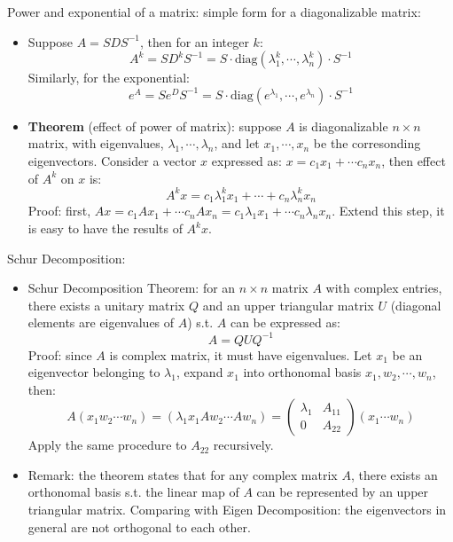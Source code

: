 \documentclass{report}
\begin{document}
Power and exponential of a matrix: simple form for a diagonalizable matrix:
\begin{itemize}
\item Suppose $A = SDS^{-1}$, then for an integer $k$: 
\begin{equation}
A^k	= S D^k S^{-1} = S \cdot \text{diag}(\lambda_1^k, \cdots, \lambda_n^k) \cdot S^{-1}
\end{equation}
Similarly, for the exponential: 
\begin{equation}
e^A	= S e^D S^{-1} = S \cdot \text{diag}(e^{\lambda_1}, \cdots, e^{\lambda_n}) \cdot S^{-1}
\end{equation}

\item \textbf{Theorem} (effect of power of matrix): suppose $A$ is diagonalizable $n \times n$ matrix, with eigenvalues, $\lambda_1, \cdots, \lambda_n$, and let $x_1, \cdots, x_n$ be the corresonding eigenvectors. Consider a vector $x$ expressed as: $x = c_1 x_1 + \cdots c_n x_n$, then effect of $A^k$ on $x$ is: 
\begin{equation}
A^k x = c_1 \lambda_1^k x_1 + \cdots + c_n \lambda_n^k x_n
\label{eq:matrix_power}
\end{equation}
Proof: first, $Ax = c_1 A x_1 + \cdots c_n A x_n = c_1 \lambda_1 x_1 + \cdots c_n \lambda_n x_n$. Extend this step, it is easy to have the results of $A^k x$. 
     	
\end{itemize}

Schur Decomposition: 
\begin{itemize}
	\item Schur Decomposition Theorem: for an $n \times n$ matrix $A$ with complex entries, there exists a unitary matrix $Q$ and an upper triangular matrix $U$ (diagonal elements are eigenvalues of $A$) s.t. $A$ can be expressed as: 
	\begin{equation}
	A = Q U Q^{-1}	
	\end{equation}
	Proof: since $A$ is complex matrix, it must have eigenvalues. Let $x_1$ be an eigenvector belonging to $\lambda_1$, expand $x_1$ into orthonomal basis $x_1, w_2, \cdots, w_n$, then: 
	\begin{equation}
	A (x_1 w_2 \cdots w_n) = (\lambda_1 x_1 Aw_2 \cdots Aw_n) = \left( \begin{array}{ll} \lambda_1 & A_{11} \\ 0 & A_{22} \end{array} \right) (x_1 \cdots w_n)
	\end{equation}
	Apply the same procedure to $A_{22}$ recursively. 
	\item Remark: the theorem states that for any complex matrix $A$, there exists an orthonomal basis s.t. the linear map of $A$ can be represented by an upper triangular matrix. Comparing with Eigen Decomposition: the eigenvectors in general are not orthogonal to each other.
\end{itemize}
\end{document}
